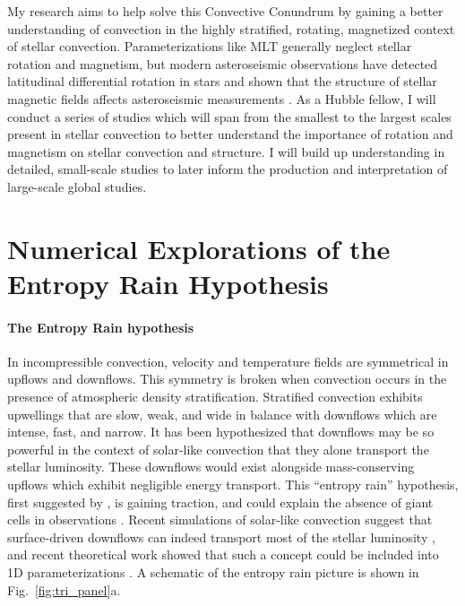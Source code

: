 \documentclass[preprint, hmargin=1in, vmargin=1in]{aastex62}
\begin{document}
My research aims to  help solve this Convective Conundrum by gaining a better understanding of convection in the highly stratified, rotating, magnetized context of stellar convection.
Parameterizations like MLT generally neglect stellar rotation and magnetism, but modern asteroseismic observations have detected latitudinal differential rotation in stars \citep{benomar&all2018} and shown that the structure of stellar magnetic fields affects asteroseismic measurements \citep{santos&all2018}.
As a Hubble fellow, I will conduct a series of studies which will span from the smallest to the largest scales present in stellar convection to better understand the importance of rotation and magnetism on stellar convection and structure.
I will build up understanding in detailed, small-scale studies to later inform the production and interpretation of large-scale global studies.

\vspace{-55pt}
\section*{\textbf{Numerical Explorations of the Entropy Rain Hypothesis}}
\paragraph{The Entropy Rain hypothesis}
In incompressible convection, velocity and temperature fields are symmetrical in upflows and downflows.
This symmetry is broken when convection occurs in the presence of atmospheric density stratification.
Stratified convection exhibits upwellings that are slow, weak, and wide in balance with downflows which are intense, fast, and narrow.
It has been hypothesized that downflows may be so powerful in the context of solar-like convection that they alone transport the stellar luminosity.
These downflows would exist alongside mass-conserving upflows which exhibit negligible energy transport.
This ``entropy rain'' hypothesis, first suggested by \citet{spruit1997}, is gaining traction, and could explain the absence of giant cells in observations \citep{hanasoge&all2015}.
Recent simulations of solar-like convection suggest that surface-driven downflows can indeed transport most of the stellar luminosity \citep{kapyla&all2017}, and recent theoretical work showed that such a concept could be included into 1D parameterizations \citep{brandenburg2016}.
A schematic of the entropy rain picture is shown in Fig.~\ref{fig:tri_panel}a.
\end{document}
